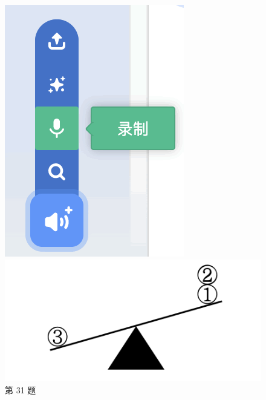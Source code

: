 \documentclass[10pt, a4paper]{article}
\begin{document}
\begin{enumerate}
\begin{figure}[htbp]
\begin{minipage}[t]{.15\textwidth}
                \includegraphics[width=\textwidth]{figure/31.png}
                \caption*{第 31 题}
            \end{minipage}
            \begin{minipage}[t]{.35\textwidth}
                \centering
                \begin{minipage}[t]{.3\textwidth}
                    \centering
                    \includegraphics[width=\textwidth]{figure/32-1.png}

\end{minipage}
\end{minipage}
\end{figure}
\end{enumerate}
\end{document}
